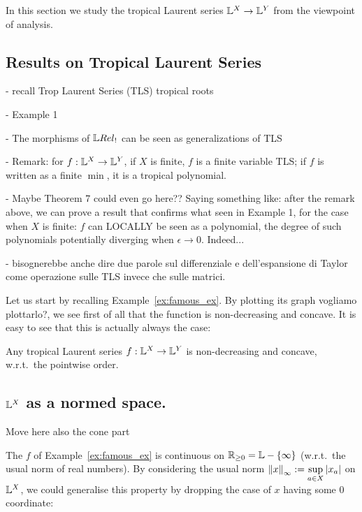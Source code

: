 In this section we study the tropical Laurent series $\mathbb{L}^X\to \mathbb{L} ^Y$ from the viewpoint of analysis.

\subsection{Results on Tropical Laurent Series}
{\color{red}

- recall Trop Laurent Series (TLS) tropical roots

- Example 1

- The morphisms of $\LREL_{!}$ can be seen as generalizations of TLS

- Remark: for $f:\mathbb{L}^{X}\to \mathbb{L}^{Y}$, if $X$ is finite, $f$ is a finite variable TLS; if $f$ is written as a finite $\min$, it is a tropical polynomial. 

- Maybe Theorem 7 could even go here?? Saying something like: after the remark above, we can prove a result that confirms what seen in Example 1, for the case when $X$ is finite: $f$ can LOCALLY be seen as a polynomial, the degree of such polynomials potentially diverging when $\epsilon\to 0$. Indeed...


- bisognerebbe anche dire due parole sul differenziale e dell'espansione di Taylor come operazione sulle TLS invece che sulle matrici. 
}

Let us start by recalling Example~\ref{ex:famous_ex}.
By plotting its graph {\color{red}vogliamo plottarlo?}, we see first of all that the function is non-decreasing and concave.
It is easy to see that this is actually always the case:

\begin{proposition}\label{prop:nondecr+conc}
 Any tropical Laurent series $f:\mathbb{L}^X\to\mathbb{L}^Y$ is non-decreasing and concave, w.r.t.\ the pointwise order.
\end{proposition}

\subsection{$\mathbb{L}^{X}$ as a normed space.}

{\color{red}Move here also the cone part}

The $f$ of Example~\ref{ex:famous_ex} is continuous on $\mathbb{R}_{\geq0}=\mathbb{L}-\{\infty\}$ (w.r.t.\ the usual norm of real numbers).
By considering the usual norm $\left\lVert x\right\rVert_\infty:=\sup\limits_{a\in X} \left\lvert x_a\right\rvert$ on $\mathbb{L}^X$, we could generalise this property by dropping the case of $x$ having some $0$ coordinate:

